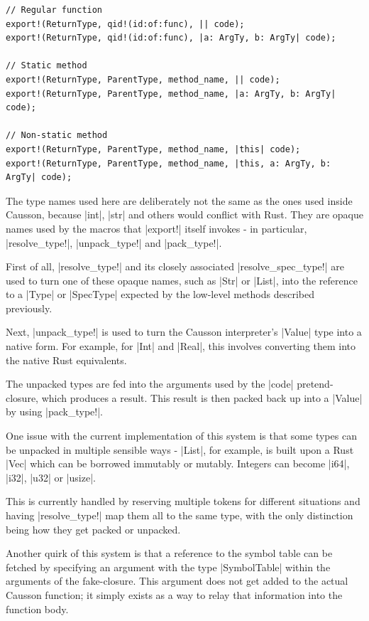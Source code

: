 \documentclass[11pt]{report}
\begin{document}
\begin{verbatim}
// Regular function
export!(ReturnType, qid!(id:of:func), || code);
export!(ReturnType, qid!(id:of:func), |a: ArgTy, b: ArgTy| code);

// Static method
export!(ReturnType, ParentType, method_name, || code);
export!(ReturnType, ParentType, method_name, |a: ArgTy, b: ArgTy| code);

// Non-static method
export!(ReturnType, ParentType, method_name, |this| code);
export!(ReturnType, ParentType, method_name, |this, a: ArgTy, b: ArgTy| code);
\end{verbatim}

The type names used here are deliberately not the same as the ones used inside Causson, because |int|, |str| and others would conflict with Rust. They are opaque names used by the macros that |export!| itself invokes - in particular, |resolve_type!|, |unpack_type!| and |pack_type!|.

First of all, |resolve_type!| and its closely associated |resolve_spec_type!| are used to turn one of these opaque names, such as |Str| or |List|, into the reference to a |Type| or |SpecType| expected by the low-level methods described previously.

Next, |unpack_type!| is used to turn the Causson interpreter's |Value| type into a native form. For example, for |Int| and |Real|, this involves converting them into the native Rust equivalents.

The unpacked types are fed into the arguments used by the |code| pretend-closure, which produces a result. This result is then packed back up into a |Value| by using |pack_type!|.

One issue with the current implementation of this system is that some types can be unpacked in multiple sensible ways - |List|, for example, is built upon a Rust |Vec| which can be borrowed immutably or mutably. Integers can become |i64|, |i32|, |u32| or |usize|.

This is currently handled by reserving multiple tokens for different situations and having |resolve_type!| map them all to the same type, with the only distinction being how they get packed or unpacked.

Another quirk of this system is that a reference to the symbol table can be fetched by specifying an argument with the type |SymbolTable| within the arguments of the fake-closure. This argument does not get added to the actual Causson function; it simply exists as a way to relay that information into the function body.
\end{document}
